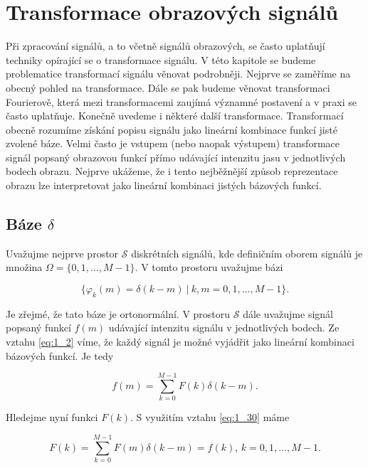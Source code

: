 \chapter*{Transformace obrazových signálů} \label{sec:transformace_obrazovych_signalu}

Při zpracování signálů, a to včetně signálů obrazových, se často uplatňují techniky opírající se o transformace signálu. V této kapitole se budeme problematice transformací signálu věnovat podrobněji. Nejprve se zaměříme na obecný pohled na transformace. Dále se pak budeme věnovat transformaci Fourierově, která mezi transformacemi zaujímá významné postavení a v praxi se často uplatňuje. Konečně uvedeme i některé další transformace. Transformací obecně rozumíme získání popisu signálu jako lineární kombinace funkcí jisté zvolené báze. Velmi často je vstupem (nebo naopak výstupem) transformace signál popsaný obrazovou funkcí přímo udávající intenzitu jasu v jednotlivých bodech obrazu. Nejprve ukážeme, že i tento nejběžnější způsob reprezentace obrazu lze interpretovat jako lineární kombinaci jistých bázových funkcí.

\section*{Báze $\delta$}

Uvažujme nejprve prostor $\mathscr{S}$ diskrétních signálů, kde definičním oborem signálů je množina $\Omega = \{0, 1, \dots, M-1\}$. V tomto prostoru uvažujme bázi

\begin{equation} \label{eq:2_1}
    \{\varphi_k(m) = \delta(k-m)\ | \ k, m = 0, 1, \dots, M-1\}.
\end{equation}

Je zřejmé, že tato báze je ortonormální. V prostoru $\mathcal{S}$ dále uvažujme signál popsaný funkcí $f(m)$ udávající intenzitu signálu v jednotlivých bodech. Ze vztahu \eqref{eq:1_2} víme, že každý signál je možné vyjádřit jako lineární kombinaci bázových funkcí. Je tedy

\begin{equation}
    f(m) = \sum\limits^{M-1}_{k=0} F(k)\delta(k-m).
\end{equation}

Hledejme nyní funkci $F(k)$. S využitím vztahu \eqref{eq:1_30} máme

\begin{equation} \label{eq:2_3}
    F(k) = \sum\limits^{M-1}_{k=0} F(m)\delta(k-m) = f(k), \, k = 0, 1, \dots, M-1.
\end{equation}

